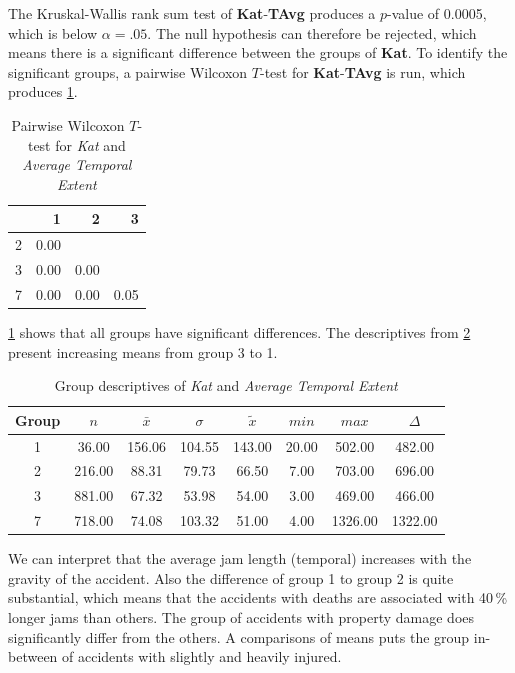 The Kruskal-Wallis rank sum test of \textbf{Kat}-\textbf{TAvg} produces a $p$-value of 0.0005, which is below $\alpha=.05$. The null hypothesis can therefore be rejected, which means there is a significant difference between the groups of \textbf{Kat}. To identify the significant groups, a pairwise Wilcoxon $T$-test for \textbf{Kat}-\textbf{TAvg} is run, which produces \cref{tbl:wilcoxon_baysis_matched_Kat_TAvg}.
\begin{table}[ht]
	\tiny
	\centering
	\begin{tabular}{rrrr}
	  	\toprule
	 	& 1 & 2 & 3 \\ 
	  	\midrule
		2 & 0.00 &  &  \\ 
	  	3 & 0.00 & 0.00 &  \\ 
	  	7 & 0.00 & 0.00 & 0.05 \\ 
	   	\bottomrule
	\end{tabular}
	\caption{Pairwise Wilcoxon $T$-test for \textit{Kat} and \textit{Average Temporal Extent}}
	\label{tbl:wilcoxon_baysis_matched_Kat_TAvg}
\end{table}
\cref{tbl:wilcoxon_baysis_matched_Kat_TAvg} shows that all groups have significant differences. The descriptives from \cref{tbl:descriptives_baysis_matched_Kat_TAvg} present increasing means from group 3 to 1.
\begin{table}[ht]
	\tiny
	\centering
	\begin{tabular}{c|c|c|c|c|c|c|c}
	  	\toprule
		Group & $n$ & $\bar{x}$ & $\sigma$ & $\tilde{x}$ & $min$ & $max$ & $\Delta$ \\ 
	  	\midrule
		1 &  36.00 & 156.06 & 104.55 & 143.00 & 20.00 & 502.00 & 482.00 \\ 
	  	2 & 216.00 & 88.31 & 79.73 & 66.50 & 7.00 & 703.00 & 696.00 \\ 
	  	3 & 881.00 & 67.32 & 53.98 & 54.00 & 3.00 & 469.00 & 466.00 \\ 
	  	7 & 718.00 & 74.08 & 103.32 & 51.00 & 4.00 & 1326.00 & 1322.00 \\ 
	   	\bottomrule
	\end{tabular}
	\caption{Group descriptives of \textit{Kat} and \textit{Average Temporal Extent}}
	\label{tbl:descriptives_baysis_matched_Kat_TAvg}
\end{table}
We can interpret that the average jam length (temporal) increases with the gravity of the accident. Also the difference of group 1 to group 2 is quite substantial, which means that the accidents with deaths are associated with 40\,\% longer jams than others. The group of accidents with property damage does significantly differ from the others. A comparisons of means puts the group in-between of accidents with slightly and heavily injured.


